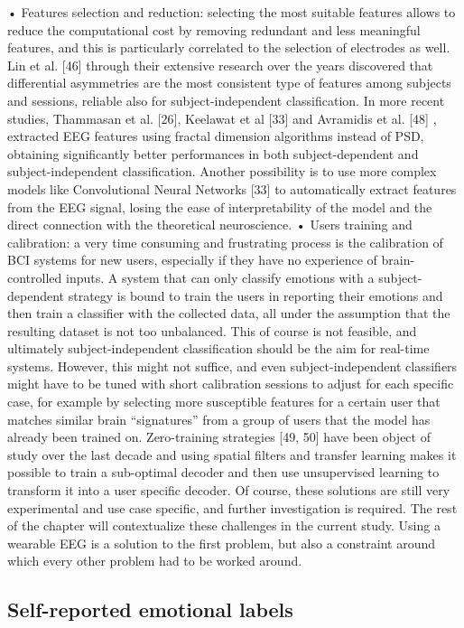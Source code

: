 •	Features selection and reduction: selecting the most suitable features allows to reduce the computational cost by removing redundant and less meaningful features, and this is particularly correlated to the selection of electrodes as well. Lin et al. [46] through their extensive research over the years discovered that differential asymmetries are the most consistent type of features among subjects and sessions, reliable also for subject-independent classification. In more recent studies, Thammasan et al. [26], Keelawat et al [33] and Avramidis et al. [48] , extracted EEG features using fractal dimension algorithms instead of PSD, obtaining significantly better performances in both subject-dependent and subject-independent classification. Another possibility is to use more complex models like Convolutional Neural Networks [33] to automatically extract features from the EEG signal, losing the ease of interpretability of the model and the direct connection with the theoretical neuroscience.
•	Users training and calibration: a very time consuming and frustrating process is the calibration of BCI systems for new users, especially if they have no experience of brain-controlled inputs. A system that can only classify emotions with a subject-dependent strategy is bound to train the users in reporting their emotions and then train a classifier with the collected data, all under the assumption that the resulting dataset is not too unbalanced. This of course is not feasible, and ultimately subject-independent classification should be the aim for real-time systems. However, this might not suffice, and even subject-independent classifiers might have to be tuned with short calibration sessions to adjust for each specific case, for example by selecting more susceptible features for a certain user that matches similar brain “signatures” from a group of users that the model has already been trained on. Zero-training strategies [49, 50] have been object of study over the last decade and using spatial filters and transfer learning makes it possible to train a sub-optimal decoder and then use unsupervised learning to transform it into a user specific decoder. Of course, these solutions are still very experimental and use case specific, and further investigation is required.
The rest of the chapter will contextualize these challenges in the current study. Using a wearable EEG is a solution to the first problem, but also a constraint around which every other problem had to be worked around.

\subsection{Self-reported emotional labels}

